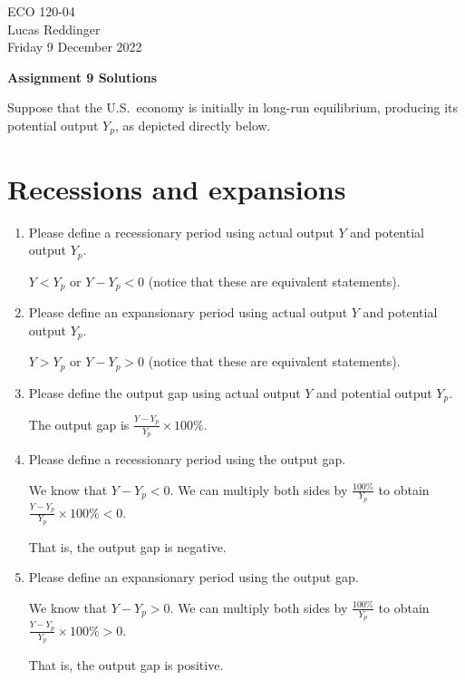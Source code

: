 \documentclass[
    letterpaper,paper=portrait,fleqn,
    DIV=16,fontsize=12pt,twoside=semi,
    parskip=full-,
    headings=standardclasses]
{scrartcl}
\begin{document}
\RaggedRight
\thispagestyle{plain}

ECO 120-04 \\
Lucas Reddinger \\
Friday 9 December 2022

\vspace{0.7\baselineskip}
\textbf{\LARGE Assignment 9 Solutions}

Suppose that the U.S.~economy is initially in long-run equilibrium, producing its potential output $Y_p$, as depicted directly below.

\section{Recessions and expansions}

\begin{enumerate}
\item Please define a recessionary period using actual output $Y$ and potential output $Y_p$.
\begin{solution}
$Y<Y_p$ or $Y-Y_p<0$ (notice that these are equivalent statements).
\end{solution}
\item Please define an expansionary period using actual output $Y$ and potential output $Y_p$.
\begin{solution}
$Y>Y_p$ or $Y-Y_p>0$ (notice that these are equivalent statements).
\end{solution}
\item Please define the output gap using actual output $Y$ and potential output $Y_p$.
\begin{solution}
The output gap is $\frac{Y-Y_p}{Y_p}\times100\%$.
\end{solution}
\item Please define a recessionary period using the output gap.
\begin{solution}
We know that $Y-Y_p<0$. We can multiply both sides by $\frac{100\%}{Y_p}$ to obtain $\frac{Y-Y_p}{Y_p}\times100\%<0$.

That is, the output gap is negative.
\end{solution}
\item Please define an expansionary period using the output gap.
\begin{solution}
We know that $Y-Y_p>0$. We can multiply both sides by $\frac{100\%}{Y_p}$ to obtain $\frac{Y-Y_p}{Y_p}\times100\%>0$.

That is, the output gap is positive.
\end{solution}
\end{enumerate}
\end{document}
